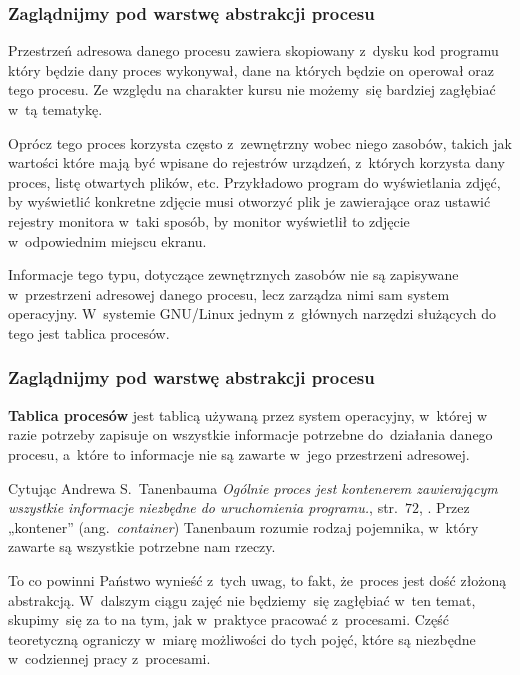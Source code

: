 \documentclass[10pt,t]{beamer}
\begin{document}
\begin{frame}
  \frametitle{Zaglądnijmy pod warstwę abstrakcji procesu}


  Przestrzeń adresowa danego procesu zawiera skopiowany z~dysku kod programu
  który będzie dany proces wykonywał, dane na których będzie on operował
  oraz
  tego procesu. Ze względu na charakter kursu nie możemy~się bardziej
  zagłębiać w~tą tematykę.

  Oprócz tego proces korzysta często z~zewnętrzny wobec niego zasobów,
  takich jak wartości które mają być wpisane do rejestrów urządzeń,
  z~których korzysta dany proces, listę otwartych plików, etc. Przykładowo
  program do wyświetlania zdjęć, by wyświetlić konkretne zdjęcie musi
  otworzyć plik je zawierające oraz ustawić rejestry monitora w~taki
  sposób, by monitor wyświetlił to zdjęcie w~odpowiednim miejscu ekranu.

  Informacje tego typu, dotyczące zewnętrznych zasobów \alert{nie} są
  zapisywane w~przestrzeni adresowej danego procesu, lecz zarządza nimi
  sam system operacyjny. W~systemie GNU/Linux jednym z~głównych narzędzi
  służących do tego jest tablica procesów.

\end{frame}





\begin{frame}
  \frametitle{Zaglądnijmy pod warstwę abstrakcji procesu}


  \textbf{Tablica procesów} jest tablicą używaną przez system operacyjny,
  w~której w razie potrzeby zapisuje on wszystkie informacje potrzebne
  do~działania danego procesu, a~które to informacje nie są zawarte w~jego
  przestrzeni adresowej.

  Cytując Andrewa S.~Tanenbauma \textit{Ogólnie proces jest kontenerem
    zawierającym wszystkie informacje niezbędne do uruchomienia programu.},
  str.~$72$, \parencite{Tannenbaum-Systemy-operacyjne-Wydanie-III-Pub-2013}.
  Przez „kontener” (ang.~\textit{container}) Tanenbaum rozumie rodzaj
  pojemnika, w~który zawarte są wszystkie potrzebne nam rzeczy.

  To co powinni Państwo wynieść z~tych uwag, to fakt, że~proces jest dość
  złożoną abstrakcją. W~dalszym ciągu zajęć nie będziemy~się zagłębiać
  w~ten temat, skupimy~się za to na tym, jak w~praktyce pracować
  z~procesami. Część teoretyczną ograniczy w~miarę możliwości do tych
  pojęć, które są niezbędne w~codziennej pracy z~procesami.

\end{frame}
\end{document}
